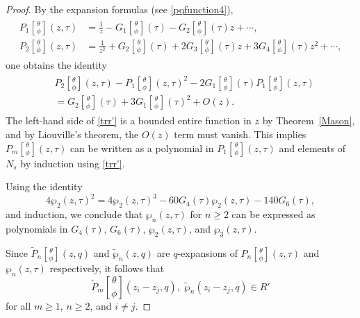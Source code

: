 \documentclass[9pt]{amsart}
\begin{document}
\begin{proof}
By the expansion formulas (see \eqref{pqfunction4}),
\begin{align}
\begin{split}
    P_1\genfrac[]{0pt}{0}{\theta}{\phi}(z, \tau) &= \frac{1}{z} - G_1\genfrac[]{0pt}{0}{\theta}{\phi}(\tau) - G_2\genfrac[]{0pt}{0}{\theta}{\phi}(\tau)z + \cdots, \\
    P_2\genfrac[]{0pt}{0}{\theta}{\phi}(z, \tau) &= \frac{1}{z^2} + G_2\genfrac[]{0pt}{0}{\theta}{\phi}(\tau) + 2 G_3\genfrac[]{0pt}{0}{\theta}{\phi}(\tau)z + 3 G_4\genfrac[]{0pt}{0}{\theta}{\phi}(\tau)z^2 + \cdots,
\end{split}
\end{align}
one obtains the identity
\begin{align}\label{trr'}
\begin{split}
    &P_2\genfrac[]{0pt}{0}{\theta}{\phi}(z, \tau) 
    - P_1\genfrac[]{0pt}{0}{\theta}{\phi}(z, \tau)^2 
    - 2 G_1\genfrac[]{0pt}{0}{\theta}{\phi}(\tau) P_1\genfrac[]{0pt}{0}{\theta}{\phi}(z, \tau) \\
    &= G_2\genfrac[]{0pt}{0}{\theta}{\phi}(\tau) 
    + 3 G_1\genfrac[]{0pt}{0}{\theta}{\phi}(\tau)^2 + O(z).
\end{split}
\end{align}
The left-hand side of \eqref{trr'} is a bounded entire function in $z$ by Theorem~\ref{Mason}, and by Liouville’s theorem, the $O(z)$ term must vanish.  
This implies $P_m\genfrac[]{0pt}{0}{\theta}{\phi}(z, \tau)$ can be written as a polynomial in $P_1\genfrac[]{0pt}{0}{\theta}{\phi}(z, \tau)$ and elements of $N_s$ by induction using \eqref{trr'}.

Using the identity
\[
4 \wp_2(z, \tau)^2 = 4 \wp_2(z, \tau)^3 - 60 G_4(\tau) \wp_2(z, \tau) - 140 G_6(\tau),
\]
and induction, we conclude that $\wp_n(z, \tau)$ for $n \geq 2$ can be expressed as polynomials in $G_4(\tau)$, $G_6(\tau)$, $\wp_2(z, \tau)$, and $\wp_3(z, \tau)$.

Since $\tilde{P}_n\genfrac[]{0pt}{0}{\theta}{\phi}(z, q)$ and $\tilde{\wp}_n(z, q)$ are $q$-expansions of $P_n\genfrac[]{0pt}{0}{\theta}{\phi}(z, \tau)$ and $\wp_n(z, \tau)$ respectively, it follows that
\[
\tilde{P}_m\genfrac[]{0pt}{0}{\theta}{\phi}(z_i - z_j, q),\; \tilde{\wp}_n(z_i - z_j, q) \in R'
\]
for all $m \geq 1$, $n \geq 2$, and $i \neq j$.
\end{proof}
\end{document}
